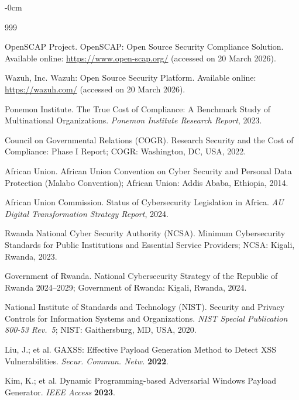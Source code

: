 \documentclass[futureinternet,article,submit,pdftex,moreauthors]{Definitions/mdpi}
\begin{document}

\begin{adjustwidth}{-\extralength}{0cm}


\begin{thebibliography}{999}

OpenSCAP Project. OpenSCAP: Open Source Security Compliance Solution. Available online:
\url{https://www.open-scap.org/} (accessed on 20 March 2026).

Wazuh, Inc. Wazuh: Open Source Security Platform. Available online:
\url{https://wazuh.com/} (accessed on 20 March 2026).

Ponemon Institute. The True Cost of Compliance: A Benchmark Study of Multinational
Organizations. \textit{Ponemon Institute Research Report}, 2023.

Council on Governmental Relations (COGR). Research Security and the Cost of Compliance:
Phase I Report; COGR: Washington, DC, USA, 2022.

African Union. African Union Convention on Cyber Security and Personal Data Protection
(Malabo Convention); African Union: Addis Ababa, Ethiopia, 2014.

African Union Commission. Status of Cybersecurity Legislation in Africa.
\textit{AU Digital Transformation Strategy Report}, 2024.

Rwanda National Cyber Security Authority (NCSA). Minimum Cybersecurity Standards for Public
Institutions and Essential Service Providers; NCSA: Kigali, Rwanda, 2023.

Government of Rwanda. National Cybersecurity Strategy of the Republic of Rwanda 2024--2029;
Government of Rwanda: Kigali, Rwanda, 2024.

National Institute of Standards and Technology (NIST). Security and Privacy Controls for
Information Systems and Organizations. \textit{NIST Special Publication 800-53 Rev.\ 5};
NIST: Gaithersburg, MD, USA, 2020.

Liu, J.; et al. GAXSS: Effective Payload Generation Method to Detect XSS Vulnerabilities.
\textit{Secur. Commun. Netw.} \textbf{2022}.

Kim, K.; et al. Dynamic Programming-based Adversarial Windows Payload Generator.
\textit{IEEE Access} \textbf{2023}.


\end{thebibliography}
\end{adjustwidth}
\end{document}
